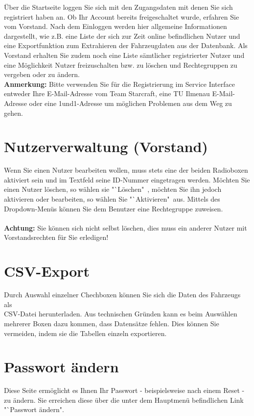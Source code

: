 \documentclass[fontsize = 12pt, paper = a4]{scrreprt}
\begin{document}
Über die Startseite loggen Sie sich mit den Zugangsdaten mit denen Sie sich registriert haben an. Ob Ihr Account bereits freigeschaltet wurde, erfahren Sie vom Vorstand. Nach dem Einloggen werden hier allgemeine Informationen dargestellt, wie z.B. eine Liste der sich zur Zeit online befindlichen Nutzer und eine Exportfunktion zum Extrahieren der Fahrzeugdaten aus der Datenbank. Als Vorstand erhalten Sie zudem noch eine Liste sämtlicher registrierter Nutzer und eine Möglichkeit Nutzer freizuschalten bzw. zu löschen und Rechtegruppen zu vergeben oder zu ändern. \\

\textbf{Anmerkung:} Bitte verwenden Sie für die Registrierung im Service Interface entweder Ihre E-Mail-Adresse vom Team Starcraft, eine TU Ilmenau E-Mail-Adresse oder eine 1und1-Adresse um möglichen Problemen aus dem Weg zu gehen.

\section{Nutzerverwaltung (Vorstand)}

Wenn Sie einen Nutzer bearbeiten wollen, muss stets eine der beiden Radioboxen aktiviert sein und im Textfeld seine ID-Nummer eingetragen werden. Möchten Sie einen Nutzer löschen, so wählen sie "`Löschen"\ , möchten Sie ihn jedoch aktivieren oder bearbeiten, so wählen Sie "`Aktivieren"\ aus. Mittels des Dropdown-Menüs können Sie dem Benutzer eine Rechtegruppe zuweisen. \\ \\
\textbf{Achtung:} Sie können sich nicht selbst löschen, dies muss ein anderer Nutzer mit Vorstandsrechten für Sie erledigen!

\section{CSV-Export}

Durch Auswahl einzelner Chechboxen können Sie sich die Daten des Fahrzeugs als \\ CSV-Datei herunterladen. Aus technischen Gründen kann es beim Auswählen mehrerer Boxen dazu kommen, dass Datensätze fehlen. Dies können Sie vermeiden, indem sie die Tabellen einzeln exportieren.

\section{Passwort ändern}

Diese Seite ermöglicht es Ihnen Ihr Passwort - beispielsweise nach einem Reset - zu ändern. Sie erreichen diese über die unter dem Hauptmenü befindlichen Link "`Passwort ändern".
\end{document}
